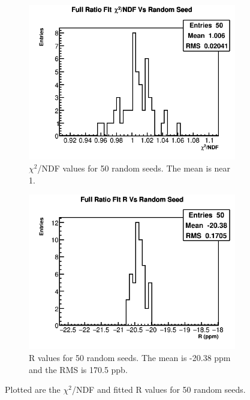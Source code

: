 		\begin{figure}[]
		\centering
		    \begin{subfigure}[t]{0.45\textwidth}
			    \centering
				\includegraphics[width=\textwidth]{RatioCBO_Chi2NDF_Vs_Iter_Canv_hist}
			    \caption{$\chi^{2}$/NDF values for 50 random seeds. The mean is near 1.}
		    \end{subfigure}
		    \hspace{4mm}
		    \begin{subfigure}[t]{0.45\textwidth}
			    \centering
				\includegraphics[width=\textwidth]{RatioCBO_R_Vs_Iter_Canv_hist}
			    \caption{R values for 50 random seeds. The mean is -20.38 ppm and the RMS is 170.5 ppb.}
			\label{Subfig:RVsRandomSeed}
		    \end{subfigure}%
		\caption[RandomSeeds]{Plotted are the $\chi^{2}$/NDF and fitted R values for 50 random seeds.}
		\label{fig:RandomSeeds}
		\end{figure}

